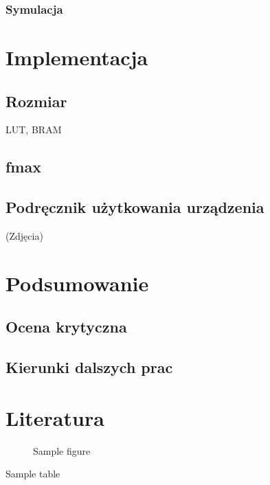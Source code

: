 \documentclass[a4paper]{report}
\begin{document}
		\subsection{Symulacja}
	
\chapter{Implementacja}
	\section{Rozmiar}
	LUT, BRAM
	\section{fmax}
	\section{Podręcznik użytkowania urządzenia}
	(Zdjęcia)
	
\chapter{Podsumowanie}
	\section{Ocena krytyczna}	
	\section{Kierunki dalszych prac}
	
\chapter{Literatura}

\begin{figure}
	\caption{Sample figure}
\end{figure}
		
\begin{table}
	\caption{Sample table}
\end{table}

\begin{appendix}
	\listoffigures
	\listoftables
\end{appendix}
\end{document}
